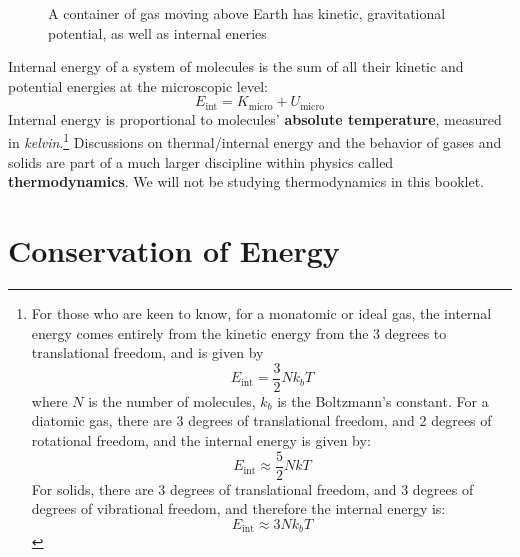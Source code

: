 \documentclass[11pt]{article}
\begin{document}
\begin{figure}[ht]
  \centering
  \caption{A container of gas moving above Earth has kinetic, gravitational
    potential, as well as internal eneries}
  \label{fig:gas}
\end{figure}
Internal energy of a system of molecules is the sum of all their kinetic and
potential energies at the microscopic level:
\begin{equation*}
  E_\text{int}=K_\text{micro} + U_\text{micro}
\end{equation*}
Internal energy is proportional to molecules' \textbf{absolute temperature},
measured in \emph{kelvin}.\footnote{For those who are keen to know, for a
monatomic or ideal gas, the internal energy comes entirely from the kinetic
energy from the 3 degrees to translational freedom, and is given by
\begin{equation*}
  E_\text{int}=\dfrac32Nk_bT
\end{equation*}
where $N$ is the number of molecules, $k_b$ is the Boltzmann's constant.%
For a diatomic gas, there are 3 degrees of translational freedom, and 2 degrees
of rotational freedom, and the internal energy is given by:
\begin{equation*}
  E_\text{int}\approx\dfrac52NkT
\end{equation*}
For solids, there are 3 degrees of translational freedom, and 3 degrees of
degrees of vibrational freedom, and therefore the internal energy is:
\begin{equation*}
  E_\text{int}\approx3Nk_bT
\end{equation*}
}
Discussions on thermal/internal energy and the behavior of gases and solids
are part of a much larger discipline within physics called
\textbf{thermodynamics}. We will not be studying thermodynamics in this
booklet.



\section{Conservation of Energy}
\end{document}
